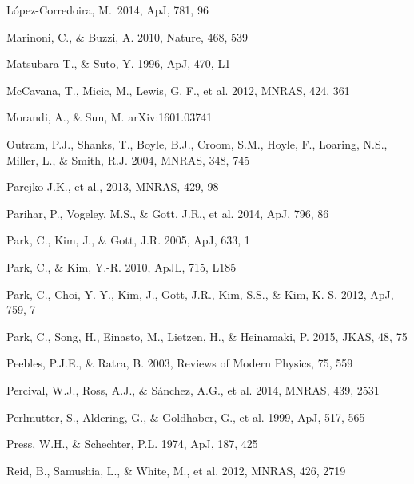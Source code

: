 \documentclass[iop]{emulateapj}
\begin{document}
\begin{thebibliography}{}
L{\'o}pez-Corredoira, M.\ 2014, ApJ, 781, 96 

Marinoni, C., \& Buzzi, A. 2010, Nature, 468, 539  

Matsubara T., \& Suto, Y. 1996, ApJ, 470, L1  

McCavana, T., Micic, M., Lewis, G. F., et al. 2012, MNRAS, 424, 361


Morandi, A., \& Sun, M. arXiv:1601.03741


Outram, P.J., Shanks, T., Boyle, B.J., Croom, S.M., Hoyle, F., Loaring, N.S., 
Miller, L., \& Smith, R.J. 2004, MNRAS, 348, 745  


Parejko J.K., et al., 2013, MNRAS, 429, 98

Parihar, P., Vogeley, M.S., \& Gott, J.R., et al. 2014, ApJ, 796, 86

Park, C., Kim, J., \& Gott, J.R. 2005, ApJ, 633, 1  

Park, C., \& Kim, Y.-R. 2010, ApJL, 715, L185  

Park, C., Choi, Y.-Y., Kim, J., Gott, J.R., Kim, S.S., \&
Kim, K.-S. 2012, ApJ, 759, 7

Park, C., Song, H., Einasto, M., Lietzen, H., \&
Heinamaki, P. 2015, JKAS, 48, 75

Peebles, P.J.E., \& Ratra, B. 2003, Reviews of Modern Physics, 75, 559

Percival, W.J., Ross, A.J., \& S\'{a}nchez, A.G., et al. 2014, MNRAS, 439, 2531

Perlmutter, S., Aldering, G., \& Goldhaber, G., et al. 1999, ApJ, 517, 565  

Press, W.H., \& Schechter, P.L. 1974, ApJ, 187, 425

Reid, B., Samushia, L., \& White, M., et al. 2012, MNRAS, 426, 2719  


\end{thebibliography}
\end{document}
